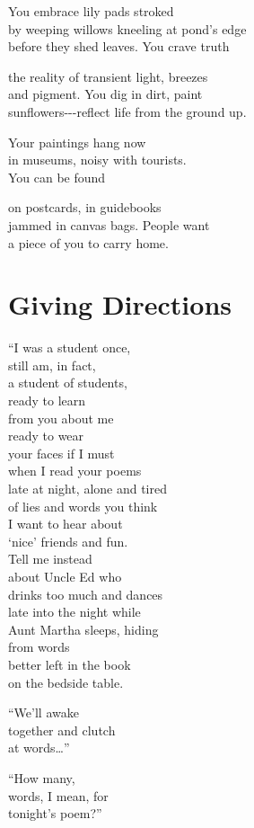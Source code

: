 \documentclass[twoside,10pt]{book}
\begin{document}
You embrace lily pads stroked\\
by weeping willows kneeling at pond's edge\\
before they shed leaves. You crave truth

the reality of transient light, breezes\\
and pigment. You dig in dirt, paint\\
sunflowers-\/-\/-reflect life from the ground up.

Your paintings hang now\\
in museums, noisy with tourists.\\
You can be found

on postcards, in guidebooks\\
jammed in canvas bags. People want\\
a piece of you to carry home.


\clearpage
\section{Giving Directions}

``I was a student once,\\
still am, in fact,\\
a student of students,\\
ready to learn\\
from you about me\\
ready to wear\\
your faces if I must\\
when I read your poems\\
late at night, alone and tired\\
of lies and words you think\\
I want to hear about\\
`nice' friends and fun.\\
Tell me instead\\
about Uncle Ed who\\
drinks too much and dances\\
late into the night while\\
Aunt Martha sleeps, hiding\\
from words\\
better left in the book\\
on the bedside table.

``We'll awake\\
together and clutch\\
at words\ldots''

``How many,\\
words, I mean, for\\
tonight's poem?''
\end{document}
